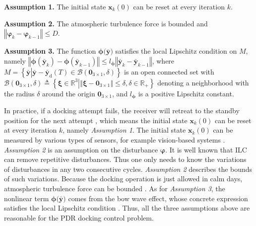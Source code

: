\textbf{Assumption 1. }The initial state $\mathbf{x}_{k}\left(  0\right)  $
can be reset at every iteration $k$.

\textbf{Assumption 2. }The atmospheric turbulence force is bounded and\textbf{
}$\left \Vert \boldsymbol{\varphi}_{k}-\boldsymbol{\varphi}_{k-1}\right \Vert
\leq D$.

\textbf{Assumption 3. }The function $\boldsymbol{\phi(}\mathbf{\bar{y})}$
satisfies the local Lipschitz condition on $M$, namely $\left \Vert
\boldsymbol{\phi}\left(  \mathbf{\bar{y}}_{k}\right)  -\boldsymbol{\phi
}\left(  \mathbf{\bar{y}}_{k-1}\right)  \right \Vert \leq l_{\boldsymbol{\phi}%
}\left \Vert \mathbf{\bar{y}}_{k}-\mathbf{\bar{y}}_{k-1}\right \Vert $, where
$M=\left \{  \mathbf{\bar{y}}\left \vert \mathbf{\bar{y}-\bar{y}}_{\text{d}%
}\left(  T\right)  \in \mathcal{B}\left(  \mathbf{0}_{3\times1},\delta \right)
\right.  \right \}  $ is an open connected set with $\mathcal{B}\left(
\mathbf{0}_{3\times1},\delta \right)  \triangleq \left \{  \boldsymbol{\xi}\in%
\mathbb{R}
^{3}\left \vert \left \Vert \boldsymbol{\xi}-\mathbf{0}_{3\times1}\right \Vert
\leq \delta,\delta \in%
\mathbb{R}
_{+}\right.  \right \}  $ denoting a neighborhood with the radius $\delta$
around the origin $\mathbf{0}_{3\times1}$, and $l_{\boldsymbol{\phi}}$ is a
positive Lipschitz constant.

In practice, if a docking attempt fails, the receiver will retreat to the
standby position for the next attempt \cite{dai2018terminal}, which means the
initial state $\mathbf{x}_{k}\left(  0\right)  $ can be reset at every
iteration $k$, namely \textit{Assumption 1}. The
initial state $\mathbf{x}_{k}\left(  0\right)  $ can be measured by various types of sensors, for example vision-based systems \cite{valasek2017fault}. \textit{Assumption 2 }is an
assumption on the disturbance $\boldsymbol{\varphi}$. It is well known that
ILC can remove repetitive disturbances. Thus one only needs to know the
variations of disturbances in any two consecutive cycles. \textit{Assumption
	2} describes the bounds of such variations. Because the docking operation is
just allowed in calm days, atmospheric turbulence force can be bounded
\cite{tandale2006trajectory,ro2010modeling}. As for \textit{Assumption 3}, the
nonlinear term $\boldsymbol{\phi(}\mathbf{\bar{y})}$ comes from the bow wave
effect, whose concrete expression satisfies the local Lipschitz condition
\cite{wei2016drogue}. Thus, all the three assumptions above are reasonable for
the PDR docking control problem.

